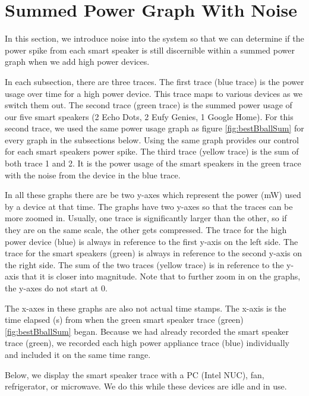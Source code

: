 \section{Summed Power Graph With Noise}
\label{sumPowerGraphWithNoise}
In this section, we introduce noise into the system so that we can determine if the power spike from each smart speaker is still discernible within a summed power graph when we add high power devices.

In each subsection, there are three traces. The first trace (blue trace) is the power usage over time for a high power device. This trace maps to various devices as we switch them out. The second trace (green trace) is the summed power usage of our five smart speakers (2 Echo Dots, 2 Eufy Genies, 1 Google Home). For this second trace, we used the same power usage graph as figure \ref{fig:bestBballSum} for every graph in the subsections below. Using the same graph provides our control for each smart speakers power spike. The third trace (yellow trace) is the sum of both trace 1 and 2. It is the power usage of the smart speakers in the green trace with the noise from the device in the blue trace.

In all these graphs there are be two y-axes which represent the power (mW) used by a device at that time. The graphs have two y-axes so that the traces can be more zoomed in. Usually, one trace is significantly larger than the other, so if they are on the same scale, the other gets compressed. The trace for the high power device (blue) is always in reference to the first y-axis on the left side. The trace for the smart speakers (green) is always in reference to the second y-axis on the right side. The sum of the two traces (yellow trace) is in reference to the y-axis that it is closer into magnitude. Note that to further zoom in on the graphs, the y-axes do not start at 0.

The x-axes in these graphs are also not actual time stamps. The x-axis is the time elapsed (s) from when the green smart speaker trace (green) \ref{fig:bestBballSum} began. Because we had already recorded the smart speaker trace (green), we recorded each high power appliance trace (blue) individually and included it on the same time range.

Below, we display the smart speaker trace with a PC (Intel NUC), fan, refrigerator, or microwave. We do this while these devices are idle and in use.

